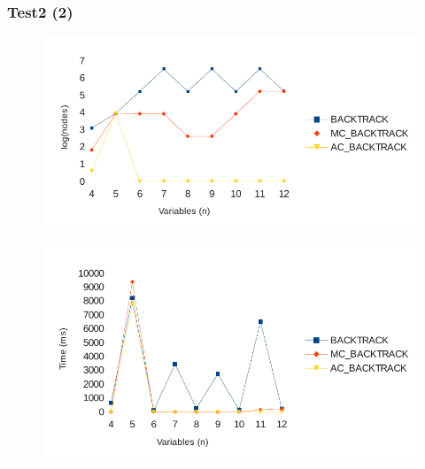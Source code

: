 \documentclass{beamer}
\begin{document}
\begin{frame}[fragile]
\frametitle{Test2 (2)}

\vspace{-.3cm}

\begin{figure}[!h]
\begin{center}
\includegraphics[scale=0.58]{./report-images/test2_nodes.pdf}
\end{center}
\end{figure}

\vspace{-.7cm}

\begin{figure}[!h]
\begin{center}
\includegraphics[scale=0.58]{./report-images/test2_time.pdf}
\end{center}
\end{figure}

\end{frame}
\end{document}
